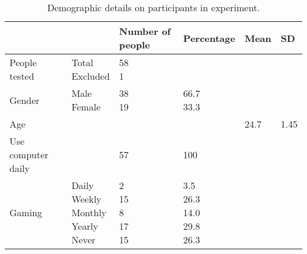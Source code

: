 \begin{table}[]
\centering
\vspace*{-2cm}
\caption{Demographic details on participants in experiment.}
\label{demographicsTable}
\small
\begin{tabular}{llllll}
\toprule
                   &                                         & Number of people  & Percentage                              & Mean & SD   \\ \midrule
People tested      & \makecell[lt]{Total\\ Excluded}                       & \makecell[lt]{58\\ 1}           &                                         &      &      \\
Gender             & \makecell[lt]{Male\\ Female}                          & \makecell[lt]{38\\ 19}          & \makecell[lt]{66.7\\ 33.3}                        &      &      \\
Age                &                                         &                   &                                         & 24.7 & 1.45 \\
Use computer daily &                                         & 57                & 100                                   &      &      \\
Gaming             & \makecell[lt]{Daily\\ Weekly\\ Monthly\\ Yearly\\ Never} & \makecell[lt]{2\\ 15\\ 8\\ 17\\ 15} & \makecell[lt]{3.5\\ 26.3\\ 14.0\\ 29.8\\ 26.3} &      &   \\  \bottomrule
\end{tabular}
\end{table}